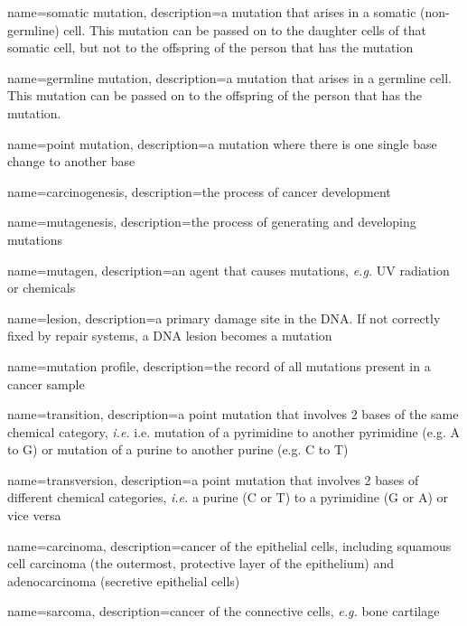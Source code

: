 {
        name=somatic mutation,
        description={a mutation that arises in a somatic (non-germline) cell. This mutation can be passed on to the daughter cells of that somatic cell, but not to the offspring of the person that has the mutation}
}

{
        name=germline mutation,
        description={a mutation that arises in a germline cell. This mutation can be passed on to the offspring of the person that has the mutation.}
}

{
        name=point mutation,
        description={a mutation where there is one single base change to another base}
}

{
        name=carcinogenesis,
        description={the process of cancer development}
}

{
        name=mutagenesis,
        description={the process of generating and developing mutations}
}

{
        name=mutagen,
        description={an agent that causes mutations, \textit{e.g.} UV radiation or chemicals}
}

{
        name=lesion,
        description={a primary damage site in the DNA. If not correctly fixed by repair systems, a DNA lesion becomes a mutation}
}

{
        name=mutation profile,
        description={the record of all mutations present in a cancer sample}
}

{
        name=transition,
        description={a point mutation that involves 2 bases of the same chemical category, \textit{i.e.} i.e. mutation of a pyrimidine to another pyrimidine (e.g. A to G) or mutation of a purine to another purine (e.g. C to T)}
}

{
        name=transversion,
        description={a point mutation that involves 2 bases of different chemical categories, \textit{i.e.} a purine (C or T) to a pyrimidine (G or A) or vice versa}
}

{
        name=carcinoma,
        description={cancer of the epithelial cells, including squamous cell carcinoma (the outermost, protective layer of the epithelium) and adenocarcinoma (secretive epithelial cells)}
}

{
        name=sarcoma,
        description={cancer of the connective cells, \textit{e.g.} bone cartilage}
}

